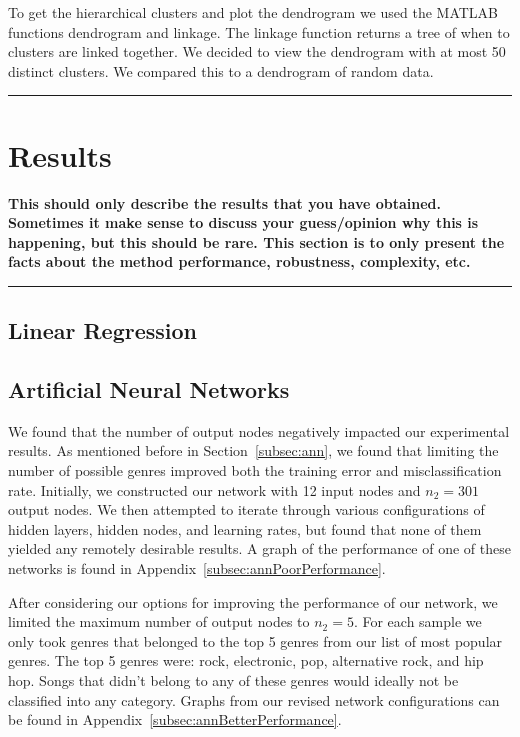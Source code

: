 \documentclass[12pt]{article}
\newcommand{\horizontalLine}{
	\begin{center}
		\hrule width 1.0\textwidth
	\end{center}
}
\newcommand{\smallHorizontalLine}{
    \begin{center}
        \hrule width 0.5\textwidth
    \end{center}}
\begin{document}
To get the hierarchical clusters and plot the dendrogram we used the MATLAB functions dendrogram and linkage. The linkage function returns a tree of when to clusters are linked together. We decided to view the dendrogram with at most 50 distinct clusters. We compared this to a dendrogram of random data.

\horizontalLine
\section{Results}
\label{sec:results}
\textbf{This should only describe the results that you have obtained. Sometimes it make sense
to discuss your guess/opinion why this is happening, but this should be rare. This section is to
only present the facts about the method performance, robustness, complexity, etc.}
\smallHorizontalLine

\subsection{Linear Regression}
\label{subsec:linearRegressionResults}

\subsection{Artificial Neural Networks}
\label{subsec:annResults}
We found that the number of output nodes negatively impacted our experimental results. As mentioned before in Section~\ref{subsec:ann}, we found that limiting the number of possible genres improved both the training error and misclassification rate. Initially, we constructed our network with 12 input nodes and $n_2 = 301$ output nodes. We then attempted to iterate through various configurations of hidden layers, hidden nodes, and learning rates, but found that none of them yielded any remotely desirable results. A graph of the performance of one of these networks is found in Appendix~\ref{subsec:annPoorPerformance}.

After considering our options for improving the performance of our network, we limited the maximum number of output nodes to $n_2 = 5$. For each sample we only took genres that belonged to the top 5 genres from our list of most popular genres. The top 5 genres were: rock, electronic, pop, alternative rock, and hip hop. Songs that didn't belong to any of these genres would ideally not be classified into any category. Graphs from our revised network configurations can be found in Appendix~\ref{subsec:annBetterPerformance}.
\end{document}
